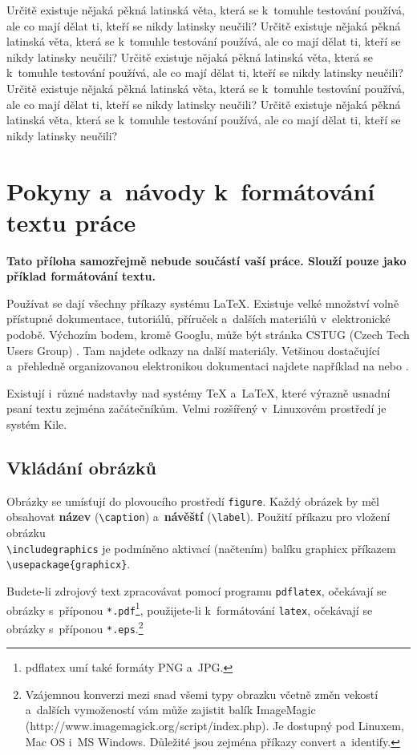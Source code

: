 \documentclass[11pt,twoside,a4paper]{book}
\begin{document}
Určitě existuje nějaká pěkná latinská věta, která se k~tomuhle testování používá, ale co mají dělat ti, kteří se nikdy
latinsky neučili? Určitě existuje nějaká pěkná latinská věta, která se k~tomuhle testování používá, ale co mají dělat
ti, kteří se nikdy latinsky neučili? Určitě existuje nějaká pěkná latinská věta, která se k~tomuhle testování používá,
ale co mají dělat ti, kteří se nikdy latinsky neučili? Určitě existuje nějaká pěkná latinská věta, která se k~tomuhle
testování používá, ale co mají dělat ti, kteří se nikdy latinsky neučili? Určitě existuje nějaká pěkná latinská věta,
která se k~tomuhle testování používá, ale co mají dělat ti, kteří se nikdy latinsky neučili?


\chapter{Pokyny a~návody k~formátování textu práce}
\textbf{\large Tato příloha samozřejmě nebude součástí vaší práce. Slouží pouze jako příklad formátování textu.}

Používat se dají všechny příkazy systému \LaTeX. Existuje velké množství volně přístupné dokumentace, tutoriálů,
příruček a~dalších materiálů v~elektronické podobě. Výchozím bodem, kromě Googlu, může být stránka CSTUG (Czech Tech
Users Group) \cite{CSTUG}. Tam najdete odkazy na další materiály.  Vetšinou dostačující a~přehledně organizovanou
elektronikou dokumentaci najdete například na \cite{latexdocweb} nebo \cite{latexwiki}.

Existují i~různé nadstavby nad systémy \TeX{} a~\LaTeX, které výrazně usnadní psaní textu zejména začátečníkům. Velmi
rozšířený v~Linuxovém prostředí je systém Kile.


\section{Vkládání obrázků}
Obrázky se umísťují do plovoucího prostředí \verb|figure|. Každý obrázek by měl obsahovat \textbf{název}
(\verb|\caption|) a~\textbf{návěští} (\verb|\label|). Použití příkazu pro vložení obrázku \\\verb|\includegraphics| je
podmíněno aktivací (načtením) balíku graphicx příkazem\\ \verb|\usepackage{graphicx}|.

Budete-li zdrojový text zpracovávat pomocí programu \verb|pdflatex|, očekávají se obrázky s~příponou
\verb|*.pdf|\footnote{pdflatex umí také formáty PNG a~JPG.}, použijete-li k~formátování \verb|latex|, očekávají se
obrázky s~příponou \verb|*.eps|.\footnote{Vzájemnou konverzi mezi snad všemi typy obrazku včetně změn vekostí a~dalších
vymožeností vám může zajistit balík ImageMagic  (http://www.imagemagick.org/script/index.php). Je dostupný pod Linuxem,
Mac OS i~MS Windows. Důležité jsou zejména příkazy convert a~identify.}
\end{document}

